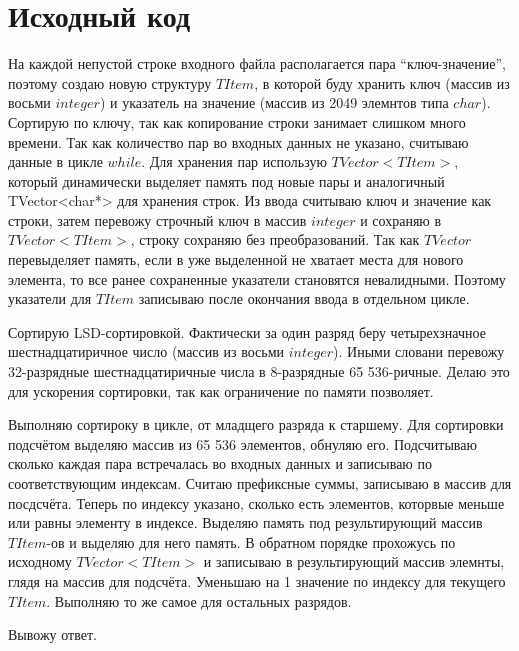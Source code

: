 \section{Исходный код}
На каждой непустой строке входного файла располагается пара \enquote{ключ-значение}, поэтому создаю новую 
структуру $TItem$, в которой буду хранить ключ (массив из восьми $integer$) и указатель на значение (массив из 2049 элемнтов типа $char$).  Сортирую по ключу, так как копирование строки занимает слишком много времени. Так как количество пар во входных данных не указано, считываю данные в цикле $while$. Для хранения пар использую $TVector<TItem>$, который динамически выделяет память под новые пары и аналогичный TVector<char*> для хранения строк. Из ввода считываю ключ и значение как строки, затем перевожу строчный ключ в массив $integer$ и сохраняю в $TVector<TItem>$, строку сохраняю без преобразований. Так как $TVector$ перевыделяет память, если в уже выделенной не хватает места для нового элемента, то все ранее сохраненные указатели становятся невалидными. Поэтому указатели для  $TItem$ записываю после окончания ввода в отдельном цикле.

Сортирую LSD-сортировкой. Фактически за один разряд беру четырехзначное шестнадцатиричное число (массив из восьми $integer$). Иными словани перевожу 32-разрядные шестнадцатиричные числа в 8-разрядные 65 536-ричные. Делаю это для ускорения сортировки, так как ограничение по памяти позволяет. 

Выполняю сортироку в цикле, от младщего разряда к старшему. Для сортировки подсчётом выделяю массив из 65 536 элементов, обнуляю его. Подсчитываю сколько каждая пара встречалась во входных данных и записываю по соответствующим индексам. Считаю префиксные суммы, записываю в массив для посдсчёта. Теперь по индексу указано, сколько есть элементов, которвые меньше или равны элементу в индексе. Выделяю память под результирующий массив $TItem$-ов и выделяю для него память. В обратном порядке прохожусь по исходному $TVector<TItem>$ и записываю в результирующий массив элемнты, глядя на массив для подсчёта. Уменьшаю на 1 значение по индексу для текущего $TItem$. Выполняю то же самое для остальных разрядов.

Вывожу ответ.

